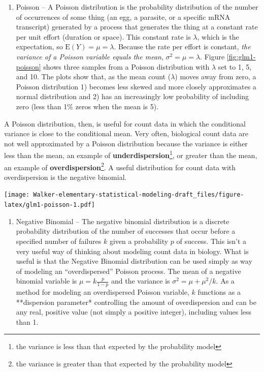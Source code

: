 \documentclass[]{book}
\providecommand{\tightlist}{%
  \setlength{\itemsep}{0pt}\setlength{\parskip}{0pt}}
\let\rmarkdownfootnote\footnote%
\def\footnote{\protect\rmarkdownfootnote}
\begin{document}
\begin{enumerate}
\def\labelenumi{\arabic{enumi}.}
\tightlist
\item
  Poisson -- A Poisson distribution is the probability distribution of
  the number of occurrences of some thing (an egg, a parasite, or a
  specific mRNA transcript) generated by a process that generates the
  thing at a constant rate per unit effort (duration or space). This
  constant rate is \(\lambda\), which is the expectation, so
  \(\mathrm{E}(Y) = \mu = \lambda\). Because the rate per effort is
  constant, \emph{the variance of a Poisson variable equals the mean},
  \(\sigma^2 = \mu = \lambda\). Figure \ref{fig:glm1-poisson} shows
  three samples from a Poisson distribution with \(\lambda\) set to 1,
  5, and 10. The plots show that, as the mean count (\(\lambda\)) moves
  away from zero, a Poisson distribution 1) becomes less skewed and more
  closely approximates a normal distribution and 2) has an increasingly
  low probability of including zero (less than 1\% zeros when the mean
  is 5).
\end{enumerate}

A Poisson distribution, then, is useful for count data in which the
conditional variance is close to the conditional mean. Very often,
biological count data are not well approximated by a Poisson
distribution because the variance is either less than the mean, an
example of \textbf{underdispersion}\footnote{the variance is less than
  that expected by the probability model}, or greater than the mean, an
example of \textbf{overdispersion}\footnote{the variance is greater than
  that expected by the probability model}. A useful distribution for
count data with overdispersion is the negative binomial.

\texttt{[image: Walker-elementary-statistical-modeling-draft\_files/figure-latex/glm1-poisson-1.pdf]}

\begin{enumerate}
\def\labelenumi{\arabic{enumi}.}
\setcounter{enumi}{1}
\tightlist
\item
  Negative Binomial -- The negative binomial distribution is a discrete
  probability distribution of the number of successes that occur before
  a specified number of failures \(k\) given a probability \(p\) of
  success. This isn't a very useful way of thinking about modeling count
  data in biology. What is useful is that the Negative Binomial
  distribution can be used simply as way of modeling an
  ``overdispersed'' Poisson process. The mean of a negative binomial
  variable is \(\mu = k\frac{p}{1-p}\) and the variance is
  \(\sigma^2 = \mu + \mu^2/k\). As a method for modeling an
  overdispersed Poisson variable, \(k\) functions as a **dispersion
  parameter* controlling the amount of overdispersion and can be any
  real, positive value (not simply a positive integer), including values
  less than 1.
\end{enumerate}
\end{document}
